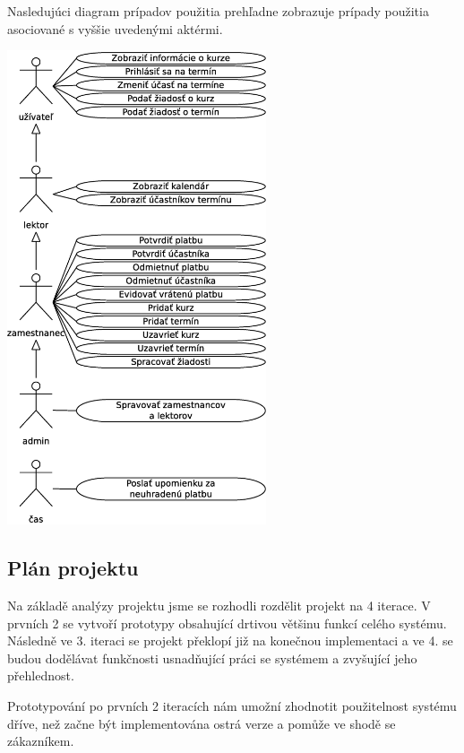 \documentclass[12pt,a4paper,titlepage,final]{report}
\begin{document}
Nasledujúci diagram prípadov použitia prehľadne zobrazuje prípady použitia asociované s vyššie uvedenými aktérmi.
		\begin{center}
			\captionsetup{type=figure}
			\includegraphics[height=14cm]{img/use_case.eps}
		\end{center}
		
	\subsection{Plán projektu}
	
Na základě analýzy projektu jsme se rozhodli rozdělit projekt na 4 iterace. V prvních 2 se vytvoří prototypy obsahující drtivou většinu funkcí celého systému. Následně ve 3. iteraci se projekt překlopí již na konečnou implementaci a ve 4. se budou dodělávat funkčnosti usnadňující práci se systémem a zvyšující jeho přehlednost.
	
Prototypování po prvních 2 iteracích nám umožní zhodnotit použitelnost systému dříve, než začne být implementována ostrá verze a pomůže ve shodě se zákazníkem.
	
\end{document}
